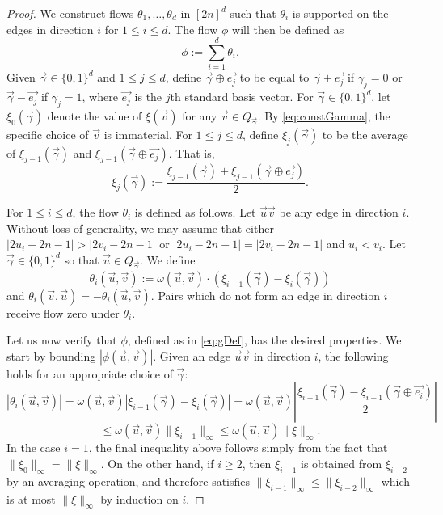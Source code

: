 \documentclass[12pt,a4paper]{amsart}
\numberwithin{equation}{section}
\theoremstyle{definition}
\begin{document}
\begin{proof}
We construct flows $\theta_1,\dots,\theta_d$ in $[2n]^d$ such that $\theta_i$ is supported on the edges in direction $i$ for $1\leq i\leq d$. The flow $\phi$ will then be defined as
\begin{equation}\label{eq:gDef}\phi:=\sum_{i=1}^d \theta_i.\end{equation}
Given $\vec{\gamma}\in\{0,1\}^d$ and $1\leq j\leq d$, define $\vec{\gamma}\oplus \vec{e_j}$ to be equal to $\vec{\gamma}+\vec{e_j}$ if $\gamma_j=0$ or $\vec{\gamma}-\vec{e_j}$ if $\gamma_j=1$, where $\vec{e_j}$ is the $j$th standard basis vector. For $\vec{\gamma}\in\{0,1\}^d$, let $\xi_0(\vec{\gamma})$ denote the value of $\xi(\vec{v})$ for any $\vec{v}\in Q_{\vec{\gamma}}$. By \eqref{eq:constGamma}, the specific choice of $\vec{v}$ is immaterial. For $1\leq j\leq d$, define $\xi_j(\vec{\gamma})$ to be the average of $\xi_{j-1}(\vec{\gamma})$ and $\xi_{j-1}\left(\vec{\gamma}\oplus \vec{e_j}\right)$. That is,
\[\xi_j(\vec{\gamma}) := \frac{\xi_{j-1}(\vec{\gamma})+\xi_{j-1}(\vec{\gamma}\oplus \vec{e_j})}{2}.\]

For $1\leq i\leq d$, the flow $\theta_i$ is defined as follows. Let $\vec{u}\vec{v}$ be any edge in direction $i$. Without loss of generality, we may assume that either $|2u_i-2n-1|> |2v_i-2n-1|$ or $|2u_i-2n-1|=|2v_i-2n-1|$ and $u_i<v_i$. Let $\vec{\gamma}\in\{0,1\}^d$ so that $\vec{u}\in Q_{\vec{\gamma}}$. We define
\[\theta_i(\vec{u},\vec{v}) := \omega(\vec{u},\vec{v})\cdot\left(\xi_{i-1}(\vec{\gamma})-\xi_{i}(\vec{\gamma})\right)\]
and $\theta_i(\vec{v},\vec{u})=-\theta_i(\vec{u},\vec{v})$. Pairs which do not form an edge in direction $i$ receive flow zero under $\theta_i$.

Let us now verify that $\phi$, defined as in \eqref{eq:gDef}, has the desired properties. We start by bounding $|\phi(\vec{u},\vec{v})|$. Given an edge $\vec{u}\vec{v}$ in direction $i$, the following holds for an appropriate choice of $\vec{\gamma}$:
\[|\theta_i(\vec{u},\vec{v})|= \omega(\vec{u},\vec{v})\left|\xi_{i-1}(\vec{\gamma})-\xi_{i}(\vec{\gamma})\right|= \omega(\vec{u},\vec{v})\left|\frac{\xi_{i-1}(\vec{\gamma}) - \xi_{i-1}\left(\vec{\gamma}\oplus \vec{e_i}\right)}{2}\right|\]
\[\leq \omega(\vec{u},\vec{v})\|\xi_{i-1}\|_\infty\leq \omega(\vec{u},\vec{v})\|\xi\|_\infty.\]
In the case $i=1$, the final inequality above follows simply from the fact that $\|\xi_0\|_\infty=\|\xi\|_\infty$. On the other hand, if $i\geq2$, then $\xi_{i-1}$ is obtained from $\xi_{i-2}$ by an averaging operation, and therefore satisfies $\|\xi_{i-1}\|_\infty\leq \|\xi_{i-2}\|_\infty$ which is at most $\|\xi\|_\infty$ by induction on $i$. 


\end{proof}
\end{document}
